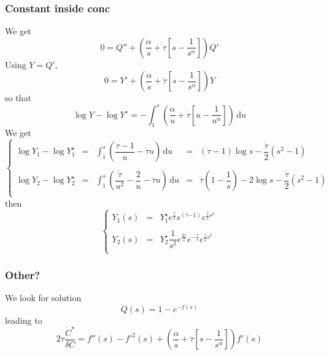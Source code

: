 \documentclass[11pt]{revtex4}
\begin{document}
\subsubsection{Constant inside conc}
We get
\begin{equation}
 0 = Q'' + \left( \dfrac{\alpha}{s} + \dot{\tau} \left[s-\dfrac{1}{s^\alpha}\right]\right) Q'
\end{equation}
Using $Y=Q'$,
\begin{equation}
	0 = Y' + \left( \dfrac{\alpha}{s} + \dot{\tau} \left[s-\dfrac{1}{s^\alpha}\right]\right) Y
\end{equation}
so that
\begin{equation}
	\log Y - \log Y^\star = -\int_{1}^s \left( \dfrac{\alpha}{u} + \dot{\tau} \left[u-\dfrac{1}{u^\alpha}\right]\right) \, \mathrm{d}u
\end{equation}
We get
\begin{equation}
\left\lbrace
\begin{array}{rclcl}
\log Y_1 - \log Y^\star_1 & = &\int_{1}^s \left( \dfrac{\dot{\tau}-1}{u} - \dot{\tau} u \right) \, \mathrm{d}u & = & (\dot{\tau}-1) \log s - \dfrac{\dot{\tau}}{2}(s^2-1)\\
\\
\log Y_2 - \log Y^\star_2 & = &\int_{1}^s \left( \dfrac{\dot{\tau}}{u^2} - \dfrac{2}{u} - \dot{\tau} u \right) \, \mathrm{d}u & = & \dot{\tau}\left(1-\dfrac{1}{s}\right)-2 \log s - \dfrac{\dot{\tau}}{2}(s^2-1)\\
\end{array}
\right.
\end{equation}
then
\begin{equation}
\left\lbrace
\begin{array}{rcl}
Y_1(s) & = & Y^\star_1 e^{\frac{\dot{\tau}}{2}} s^{(\dot{\tau}{-1})} e^{\frac{\dot{\tau}}{2}s^2}\\
\\
Y_2(s) & = & Y^\star_2 \dfrac{1}{s^2} e^{\frac{3\dot{\tau}}{2}} e^{-\frac{\dot{\tau}}{s}} e^{\frac{\dot{\tau}}{2}s^2}\\
\end{array}
\right.
\end{equation}


\subsubsection{Other?}
We look for solution
\begin{equation}
	Q(s) = 1 - e^{-f(s)}
\end{equation}
leading to
\begin{equation}
	2\tau \dfrac{\dot{C}^\star}{\delta C} = f''(s) - f'^2(s) + \left( \dfrac{\alpha}{s} + \dot{\tau} \left[s-\dfrac{1}{s^\alpha}\right]\right) f'(s)
\end{equation}
\end{document}
